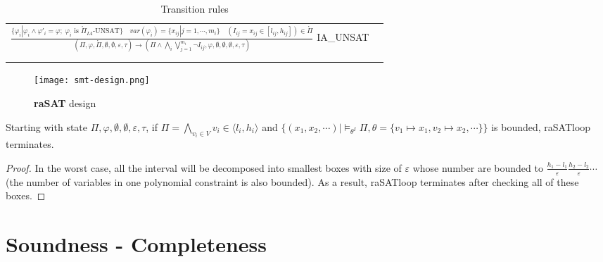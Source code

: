 \begin{table*}[t]
\begin{tabular}{ll}
  \large 
  $\frac{\{\varphi_i| \varphi_i \wedge \varphi'_i = \varphi; \; \varphi_i \text{ is } \mathring{\Pi}_{IA}\text{-UNSAT}\} \quad var(\varphi_i) = \{x_{ij}|j=1,\cdots, m_i\} \quad (I_{ij} = x_{ij} \in [l_{ij}, h_{ij}]) \in \mathring{\Pi}}{(\Pi, \varphi, \mathring{\Pi}, \emptyset, \emptyset, \varepsilon, \tau) \to (\Pi \wedge \bigwedge\limits_i \bigvee\limits_{j=1}^{m_i} \neg I_{ij}, \varphi, \emptyset, \emptyset, \emptyset, \varepsilon, \tau)}$ \tiny IA\_UNSAT \\\\
  \hline\\
  \end{tabular}
  \caption{Transition rules}\label{tab:transition-rules}
\end{table*}

\begin{figure}[ht]
\centering
\texttt{[image: smt-design.png]} 
\caption{\textbf{raSAT} design} 
\label{fig:smt-design} 
\end{figure}

\begin{theorem} \label{theorem:terminating}
Starting with state $\Pi, \varphi, \emptyset, \emptyset, \varepsilon, \tau$, if $\Pi = \bigwedge\limits_{v_i \in V} v_i \in \langle l_i, h_i \rangle$ and $\{(x_1, x_2, \cdots) | \models_{\theta^I} \Pi, \theta = \{v_1 \mapsto x_1, v_2 \mapsto x_2, \cdots\} \}$ is bounded, raSATloop terminates.
\end{theorem}

\begin{proof}
In the worst case, all the interval will be decomposed into smallest boxes with size of $\varepsilon$ whose number are bounded to $\frac{h_1 - l_1}{\varepsilon}\frac{h_2 - l_2}{\varepsilon}\cdots$ (the number of variables in one polynomial constraint is also bounded). As a result, raSATloop terminates after checking all of these boxes.
\end{proof}

\section{Soundness - Completeness}
